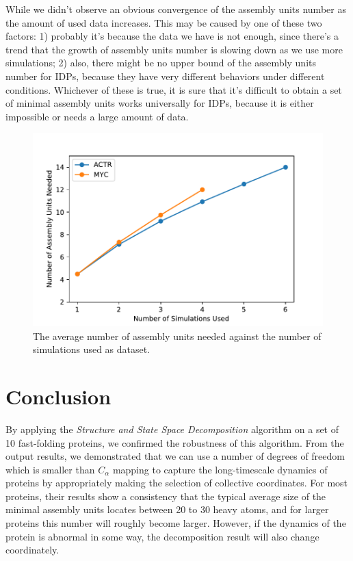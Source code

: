 \documentclass[12pt]{article}
\begin{document}
While we didn't observe an obvious convergence of the assembly units number as the amount of used data increases. This may be caused by one of these two factors: 1) probably it's because the data we have is not enough, since there's a trend that the growth of assembly units number is slowing down as we use more simulations; 2) also, there might be no upper bound of the assembly units number for IDPs, because they have very different behaviors under different conditions. Whichever of these is true, it is sure that it's difficult to obtain a set of minimal assembly units works universally for IDPs, because it is either impossible or needs a large amount of data.

\begin{figure}[htbp]
  \centering
  \includegraphics[width=1\textwidth]{IDP_N_units.pdf}
  \caption{\label{IDP_N_units}The average number of assembly units needed against the number of simulations used as dataset.}
\end{figure}

\section*{Conclusion}

By applying the {\it Structure and State Space Decomposition} algorithm\cite{Lrenzo_S3D} on a set of 10 fast-folding proteins, we confirmed the robustness of this algorithm. From the output results, we demonstrated that we can use a number of degrees of freedom which is smaller than $C_{\alpha}$ mapping to capture the long-timescale dynamics of proteins by appropriately making the selection of collective coordinates. For most proteins, their results show a consistency that the typical average size of the minimal assembly units locates between 20 to 30 heavy atoms, and for larger proteins this number will roughly become larger. However, if the dynamics of the protein is abnormal in some way, the decomposition result will also change coordinately.
\end{document}
